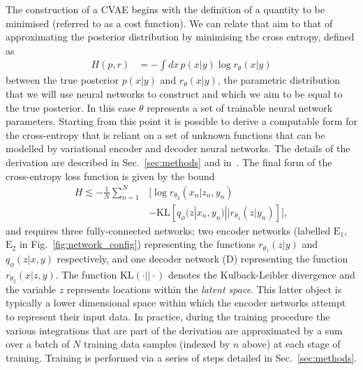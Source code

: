 \documentclass[%
showpacs,
 amsmath,amssymb,
 aps,
 twocolumn,
 prl,
 reprint,
floatfix,
]{revtex4-1}
\begin{document}
%
%
The construction of a \ac{CVAE} begins with the definition of a quantity to be
minimised (referred to as a cost function). We can relate that aim to
that of approximating the posterior distribution by minimising the cross
entropy, defined as
%
\begin{align}\label{eq:cross_ent} 
H(p,r) &= -\int dx\, p(x|y) \log r_{\theta}(x|y) 
\end{align}
%
between the true posterior $p(x|y)$ and $r_{\theta}(x|y)$, the parametric
distribution that we will use neural networks to construct and which we aim to
be equal to the true posterior. In this case $\theta$ represents a set of
trainable neural network parameters. Starting from this point it is possible to
derive a computable form for the cross-entropy that is reliant on a set of
unknown functions that can be modelled by variational encoder
and decoder neural networks. The details of the derivation are described in
Sec.~\ref{sec:methods} and in~\cite{1904.06264}. The final form of the
cross-entropy loss function is given by the bound
%
\begin{align}\label{eq:cost3}
H \lesssim -\frac{1}{N}\sum_{n=1}^{N}&\Big[\log
r_{\theta_{2}}(x_{n}|z_{n},y_{n})\nonumber\\
&-\text{KL}\left[q_{\phi}(z|x_{n},y_{n})||r_{\theta_{1}}(z|y_{n})\right]\Big],
\end{align}
%
and requires three fully-connected networks; two encoder networks (labelled
$\textrm{E}_1$, $\textrm{E}_2$ in Fig.~\ref{fig:network_config}) representing
the functions $r_{\theta_{1}}(z|y)$ and $q_{\phi}(z|x,y)$ respectively, and one
decoder network (D) representing the function $r_{\theta_{2}}(x|z,y)$. The
function $\text{KL}(\cdot||\cdot)$ denotes the Kulback-Leibler divergence and
the variable $z$ represents locations within the \emph{latent space}.  This
latter object is typically a lower dimensional space within which the encoder
networks attempt to represent their input data. In practice, during the
training procedure the various integrations that are part of the derivation are
approximated by a sum over a batch of $N$ training data samples (indexed by $n$
above) at each stage of training. Training is performed via a series of steps
detailed in Sec.~\ref{sec:methods}.
\end{document}
